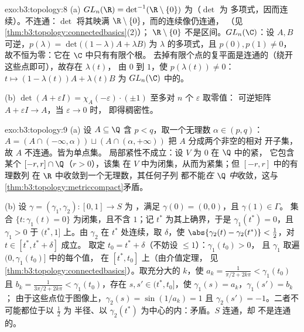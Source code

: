 \begin{solution}{exo:b3:topology:8}
(a) $GL_n(\R) = \det^{-1}(\R\setminus\{0\})$ 为（$\det$ 为
多项式，因而连续）。不连通：$\det$ 将其映满
$\R\setminus\{0\}$，而的连续像仍连通，
（见\cref{thm:b3:topology:connectedbasics}(2)）；
$\R\setminus\{0\}$ 不是区间。$GL_n(\C)$：设 $A, B$
可逆，$p(\lambda) = \det\bigl((1-\lambda)A + \lambda
B\bigr)$ 为 $\lambda$ 的多项式，且 $p(0), p(1) \neq 0$，
故不恒为零：它在 $\C$ 中只有有限个根。
去掉有限个点的复平面是连通的（绕开
这些点即可），故存在 $\lambda(t)$，
由 $0$ 到 $1$，使 $p(\lambda(t)) \neq 0$：$t \mapsto
(1-\lambda(t))A + \lambda(t)B$ 为 $GL_n(\C)$ 中的。

(b) $\det(A + \varepsilon I) = \chi_A(-\varepsilon)\cdot(\pm1)$
至多对 $n$ 个 $\varepsilon$ 取零值：
可逆矩阵 $A + \varepsilon I \to A$，当 $\varepsilon \to 0$ 时，
即得稠密性。
\end{solution}

\begin{solution}{exo:b3:topology:9}
(a) 设 $A \subseteq \Q$ 含 $p < q$，取一个无理数
$\alpha \in (p, q)$：$A = (A \cap (-\infty, \alpha)) \sqcup
(A\cap(\alpha, +\infty))$ 把 $A$ 分成两个非空的相对
开子集，故 $A$ 不连通。皆为单点集。
局部紧性不成立：设 $V$ 为 $0$ 在 $\Q$ 中的紧，
它包含某个 $[-r, r]\cap\Q$（$r > 0$），该集
在 $V$ 中为闭集，从而为紧集；但 $[-r,r]$ 中的有理数列
在 $\R$ 中收敛到一个无理数，其任何子列
都不能\emph{在 $\Q$ 中}收敛，这与
\cref{thm:b3:topology:metriccompact}矛盾。

(b) 设 $\gamma = (\gamma_1, \gamma_2) \colon [0,1] \to S$ 为
，满足 $\gamma(0) = (0,0)$，且 $\gamma(1) \in \Gamma$。
集合 $\{t : \gamma_1(t) = 0\}$ 为闭集，且不含
$1$；记 $t^*$ 为其上确界，于是 $\gamma_1(t^*) = 0$，且
$\gamma_1 > 0$ 于 $(t^*, 1]$ 上。由 $\gamma_2$ 在
$t^*$ 处连续，取 $\delta$，使 $\abs{\gamma_2(t) -
\gamma_2(t^*)} < \tfrac12$，对 $t \in [t^*, t^* + \delta]$ 成立。
取定 $t_0 = t^* + \delta$（不妨设 $\leq 1$）：$\gamma_1(t_0) > 0$，
且 $\gamma_1$ 取遍 $(0, \gamma_1(t_0)]$ 中的每个值，
在 $[t^*, t_0]$ 上（由介值定理，
见\cref{thm:b3:topology:connectedbasics}）。取充分大的 $k$，使
$a_k = \frac1{\pi/2 + 2k\pi} < \gamma_1(t_0)$ 且 $b_k =
\frac1{3\pi/2 + 2k\pi} < \gamma_1(t_0)$，存在 $s, s' \in
(t^*, t_0]$，使 $\gamma_1(s) = a_k$，$\gamma_1(s') = b_k$；
由于这些点位于图像上，$\gamma_2(s) = \sin(1/a_k) =
1$ 且 $\gamma_2(s') = -1$。二者不可能都位于以 $\frac12$ 为
半径、以 $\gamma_2(t^*)$ 为中心的内：矛盾。$S$ 连通，却
不是连通的。
\end{solution}

